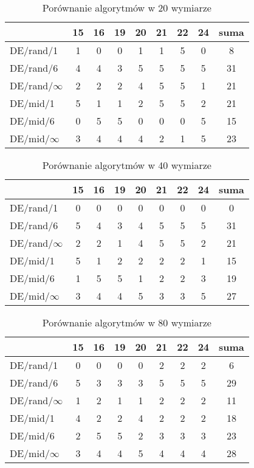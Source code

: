 \documentclass[12pt, a4paper]{article}
\begin{document}
\begin{table}[H]
\centering
\begin{tabular}{ l | c | c | c | c | c | c | c | c}
                 & 15 & 16 & 19 & 20 & 21 & 22 & 24 & suma \\ \hline
DE/rand/1        & 1  & 0  & 0  & 1  & 1  & 5  & 0  & 8    \\ 
DE/rand/6        & 4  & 4  & 3  & 5  & 5  & 5  & 5  & 31   \\ 
DE/rand/$\infty$ & 2  & 2  & 2  & 4  & 5  & 5  & 1  & 21   \\ 
DE/mid/1         & 5  & 1  & 1  & 2  & 5  & 5  & 2  & 21   \\
DE/mid/6         & 0  & 5  & 5  & 0  & 0  & 0  & 5  & 15   \\ 
DE/mid/$\infty$  & 3  & 4  & 4  & 4  & 2  & 1  & 5  & 23   \\
\end{tabular}
\caption{Porównanie algorytmów w 20 wymiarze}
\label{table:20d}
\end{table}

\begin{table}[H]
\centering
\begin{tabular}{ l | c | c | c | c | c | c | c | c}
                 & 15 & 16 & 19 & 20 & 21 & 22 & 24 & suma \\ \hline
DE/rand/1        & 0  & 0  & 0  & 0  & 0  & 0  & 0  & 0    \\ 
DE/rand/6        & 5  & 4  & 3  & 4  & 5  & 5  & 5  & 31   \\ 
DE/rand/$\infty$ & 2  & 2  & 1  & 4  & 5  & 5  & 2  & 21   \\ 
DE/mid/1         & 5  & 1  & 2  & 2  & 2  & 2  & 1  & 15   \\
DE/mid/6         & 1  & 5  & 5  & 1  & 2  & 2  & 3  & 19   \\ 
DE/mid/$\infty$  & 3  & 4  & 4  & 5  & 3  & 3  & 5  & 27   \\
\end{tabular}
\caption{Porównanie algorytmów w 40 wymiarze}
\label{table:40d}
\end{table}

\begin{table}[H]
\centering
\begin{tabular}{ l | c | c | c | c | c | c | c | c}
                 & 15 & 16 & 19 & 20 & 21 & 22 & 24 & suma \\ \hline
DE/rand/1        & 0  & 0  & 0  & 0  & 2  & 2  & 2  & 6    \\ 
DE/rand/6        & 5  & 3  & 3  & 3  & 5  & 5  & 5  & 29   \\ 
DE/rand/$\infty$ & 1  & 2  & 1  & 1  & 2  & 2  & 2  & 11   \\ 
DE/mid/1         & 4  & 2  & 2  & 4  & 2  & 2  & 2  & 18   \\
DE/mid/6         & 2  & 5  & 5  & 2  & 3  & 3  & 3  & 23   \\ 
DE/mid/$\infty$  & 3  & 4  & 4  & 5  & 4  & 4  & 4  & 28   \\
\end{tabular}
\caption{Porównanie algorytmów w 80 wymiarze}
\label{table:80d}
\end{table}
\end{document}
